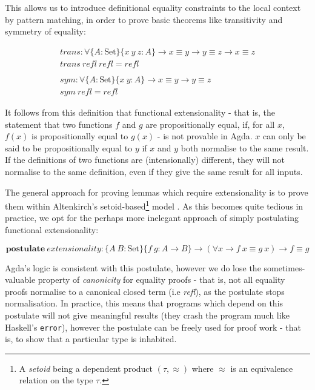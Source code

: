 \documentclass[a4paper]{jfp}
\begin{document}
\medskip

This allows us to introduce definitional equality constraints to the local context by pattern matching, in order to prove basic theorems like transitivity and symmetry of equality:

\begin{displaymath}
	\begin{array}{l}
		\mathit{trans} :  \forall \{A : \text{Set}\}\{x\ y\ z : A\} \rightarrow x \equiv y \rightarrow y \equiv z \rightarrow x \equiv z \\
		\mathit{trans}\ \mathit{refl}\ \mathit{refl} = \mathit{refl} \\
		\\
		\mathit{sym} : \forall \{A : \text{Set}\}\{x\ y : A\} \rightarrow x \equiv y \rightarrow y \equiv z \\
		\mathit{sym}\ \mathit{refl} = \mathit{refl}
    \end{array}
\end{displaymath}

\medskip

It follows from this definition that functional extensionality - that is, the statement that two functions $f$ and $g$ are propositionally equal, if, for all $x$, $f(x)$ is propositionally equal to $g(x)$ - is not provable in Agda. $x$ can only be said to be propositionally equal to $y$ if $x$ and $y$ both normalise to the same result. If the definitions of two functions are (intensionally) different, they will not normalise to the same definition, even if they give the same result for all inputs.


The general approach for proving lemmas which require extensionality is to prove them within Altenkirch's setoid-based\footnote{A \emph{setoid} being a dependent product $(\tau, \approx)$ where $\approx$ is an equivalence relation on the type $\tau$.} model \cite{Altenkirch:1999:EEI:788021.788977}. As this becomes quite tedious in practice, we opt for the perhaps more inelegant approach of simply postulating functional extensionality:

\begin{displaymath}
	\textbf{postulate}\ \mathit{extensionality} : \{A\ B : \text{Set}\}\{f\ g : A \rightarrow B \} \rightarrow (\forall x \rightarrow f\ x \equiv g\ x) \rightarrow f \equiv g
\end{displaymath}

\medskip

Agda's logic is consistent with this postulate, however we do lose the sometimes-valuable property of \emph{canonicity} for equality proofs - that is, not all equality proofs normalise to a canonical closed term (i.e \emph{refl}), as the postulate stops normalisation. In practice, this means that programs which depend on this postulate will not give meaningful results (they crash the program much like Haskell's {\tt error}), however the postulate can be freely used for proof work - that is, to show that a particular type is inhabited.
\end{document}
